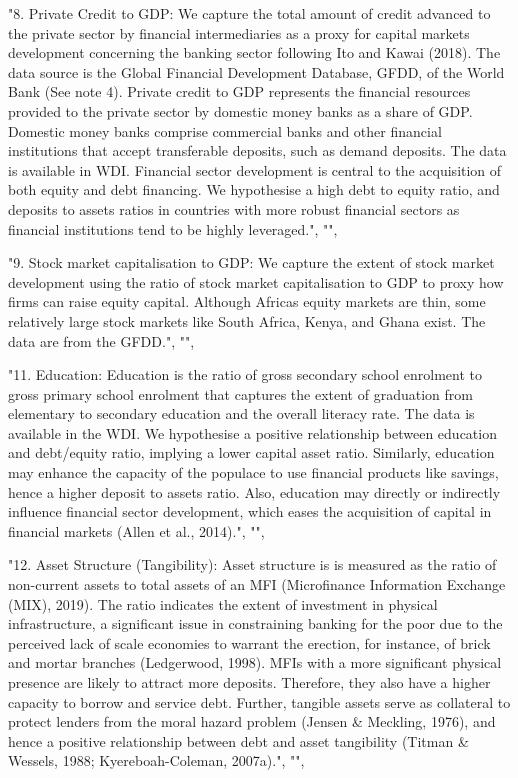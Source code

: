 \documentclass[a4paper,nobind]{templates/ociamthesis}
\newenvironment{Shaded}{\begin{snugshade}}{\end{snugshade}}
\newcommand{\NormalTok}[1]{#1}
\newcommand{\StringTok}[1]{\textcolor[rgb]{0.31,0.60,0.02}{#1}}
\renewenvironment{Shaded}
{
  \vspace{10pt}%
  \begin{snugshade}%
}{%
  \end{snugshade}%
  \vspace{8pt}%
}
\begin{document}
\begin{Shaded}
\begin{Highlighting}[]
\StringTok{"8. Private Credit to GDP: We capture the total amount of credit advanced to the private sector by financial intermediaries as a proxy for capital markets development concerning the banking sector following Ito and Kawai (2018). The data source is the Global Financial Development Database, GFDD, of the World Bank (See note 4). Private credit to GDP represents the financial resources provided to the private sector by domestic money banks as a share of GDP. Domestic money banks comprise commercial banks and other financial institutions that accept transferable deposits, such as demand deposits. The data is available in WDI. Financial sector development is central to the acquisition of both equity and debt financing. We hypothesise a high debt to equity ratio, and deposits to assets ratios in countries with more robust financial sectors as financial institutions tend to be highly leveraged."}\NormalTok{, }\StringTok{""}\NormalTok{, }

\StringTok{"9. Stock market capitalisation to GDP: We capture the extent of stock market development using the ratio of stock market capitalisation to GDP to proxy how firms can raise equity capital. Although Africa\textquotesingle{}s equity markets are thin, some relatively large stock markets like South Africa, Kenya, and Ghana exist. The data are from the GFDD."}\NormalTok{, }\StringTok{""}\NormalTok{, }

\StringTok{"11. Education: Education is the ratio of gross secondary school enrolment to gross primary school enrolment that captures the extent of graduation from elementary to secondary education and the overall literacy rate. The data is available in the WDI. We hypothesise a positive relationship between education and debt/equity ratio, implying a lower capital asset ratio. Similarly, education may enhance the capacity of the populace to use financial products like savings, hence a higher deposit to assets ratio.  Also, education may directly or indirectly influence financial sector development, which eases the acquisition of capital in financial markets (Allen et al., 2014)."}\NormalTok{, }\StringTok{""}\NormalTok{, }

\StringTok{"12. Asset Structure (Tangibility): Asset structure is is measured as the ratio of non{-}current assets to total assets of an MFI (Microfinance Information Exchange (MIX), 2019). The ratio indicates the extent of investment in physical infrastructure, a significant issue in constraining banking for the poor due to the perceived lack of scale economies to warrant the erection, for instance, of brick and mortar branches (Ledgerwood, 1998). MFIs with a more significant physical presence are likely to attract more deposits. Therefore, they also have a higher capacity to borrow and service debt. Further, tangible assets serve as collateral to protect lenders from the moral hazard problem (Jensen \& Meckling, 1976), and hence a positive relationship between debt and asset tangibility (Titman \& Wessels, 1988; Kyereboah{-}Coleman, 2007a)."}\NormalTok{, }\StringTok{""}\NormalTok{, }


\end{Highlighting}
\end{Shaded}
\end{document}
